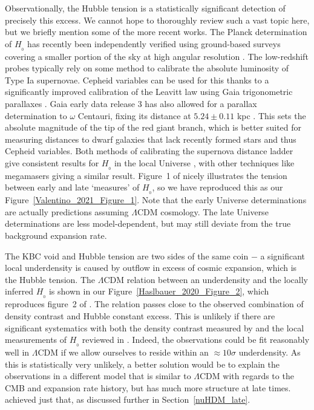 \documentclass[fleqn,usenatbib,useAMS]{mnras} %
\begin{document}
Observationally, the Hubble tension \citep[reviewed in][]{Riess_2020} is a statistically significant detection of precisely this excess. We cannot hope to thoroughly review such a vast topic here, but we briefly mention some of the more recent works. The Planck determination of $H_{_0}$ \citep{Planck_2020} has recently been independently verified using ground-based surveys covering a smaller portion of the sky at high angular resolution \citep{Aiola_2020}. The low-redshift probes typically rely on some method to calibrate the absolute luminosity of Type Ia supernovae. Cepheid variables can be used for this thanks to a significantly improved calibration of the Leavitt law using Gaia trigonometric parallaxes \citep{Riess_2021}. Gaia early data release 3 \citep{Gaia_2021} has also allowed for a parallax determination to $\omega$ Centauri, fixing its distance at $5.24 \pm 0.11$ kpc \citep{Soltis_2021}. This sets the absolute magnitude of the tip of the red giant branch, which is better suited for measuring distances to dwarf galaxies that lack recently formed stars and thus Cepheid variables. Both methods of calibrating the supernova distance ladder give consistent results for $H_{_0}$ in the local Universe \citep[see also][]{Anand_2022}, with other techniques like megamasers \citep{Pesce_2020} giving a similar result. Figure~1 of \citet{Valentino_2021} nicely illustrates the tension between early and late `measures' of $H_{_0}$, so we have reproduced this as our Figure~\ref{Valentino_2021_Figure_1}. Note that the early Universe determinations are actually predictions assuming $\Lambda$CDM cosmology. The late Universe determinations are less model-dependent, but may still deviate from the true background expansion rate.

The KBC void and Hubble tension are two sides of the same coin $-$ a significant local underdensity is caused by outflow in excess of cosmic expansion, which is the Hubble tension. The $\Lambda$CDM relation between an underdensity and the locally inferred $H_{_0}$ is shown in our Figure~\ref{Haslbauer_2020_Figure_2}, which reproduces figure~2 of \citet{Haslbauer_2020}. The relation passes close to the observed combination of density contrast and Hubble constant excess. This is unlikely if there are significant systematics with both the density contrast measured by \citet{Keenan_2013} and the local measurements of $H_{_0}$ reviewed in \citet{Valentino_2021}. Indeed, the observations could be fit reasonably well in $\Lambda$CDM if we allow ourselves to reside within an $\approx 10\sigma$ underdensity. As this is statistically very unlikely, a better solution would be to explain the observations in a different model that is similar to $\Lambda$CDM with regards to the CMB and expansion rate history, but has much more structure at late times. \citet{Haslbauer_2020} achieved just that, as discussed further in Section~\ref{nuHDM_late}.
\end{document}
